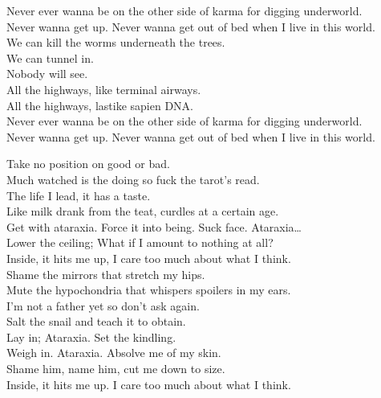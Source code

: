 Never ever wanna be on the other side of karma for digging underworld. \\
Never wanna get up. Never wanna get out of bed when I live in this world. \\

We can kill the worms underneath the trees. \\
We can tunnel in. \\
Nobody will see. \\

All the highways, like terminal airways. \\
All the highways, lastike sapien DNA. \\

Never ever wanna be on the other side of karma for digging underworld. \\
Never wanna get up. Never wanna get out of bed when I live in this world. \\




Take no position on good or bad. \\
Much watched is the doing so fuck the tarot's read. \\
The life I lead, it has a taste. \\
Like milk drank from the teat, curdles at a certain age. \\

Get with ataraxia. Force it into being. Suck face. Ataraxia… \\
Lower the ceiling; What if I amount to nothing at all? \\
Inside, it hits me up, I care too much about what I think. \\

Shame the mirrors that stretch my hips. \\
Mute the hypochondria that whispers spoilers in my ears. \\
I'm not a father yet so don't ask again. \\
Salt the snail and teach it to obtain. \\

Lay in; Ataraxia. Set the kindling. \\
Weigh in. Ataraxia. Absolve me of my skin. \\
Shame him, name him, cut me down to size. \\
Inside, it hits me up. I care too much about what I think. \\

